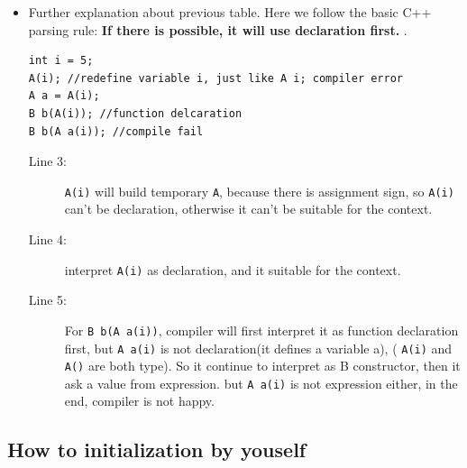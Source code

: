 \documentclass[a4paper,11pt,twoside]{book}
\begin{document}
\begin{itemize}
	\item Further explanation about previous table. Here we follow the basic C++ parsing rule: \textbf{If there is possible, it will use declaration first. }.
\begin{lstlisting}
int i = 5;
A(i); //redefine variable i, just like A i; compiler error
A a = A(i);
B b(A(i)); //function delcaration
B b(A a(i)); //compile fail
\end{lstlisting}	
	\begin{description}
		\item[Line 3:] \texttt{A(i)} will build temporary \texttt{A}, because there is assignment sign, so \texttt{A(i)} can't be declaration, otherwise it can't be suitable for the context.
		
		\item[Line 4:] interpret \texttt{A(i)} as declaration, and it suitable for the context.
		
		\item[Line 5:] For \texttt{B b(A a(i))}, compiler will first interpret it as function declaration first, but \texttt{A a(i)} is not declaration(it defines a variable a), ( \texttt{A(i)} and \texttt{A()} are both type). So it continue to interpret as B constructor, then it ask a value from expression. but \texttt{A a(i)} is not expression either, in the end, compiler is not happy. 
	\end{description}
			
\end{itemize}

\subsection{How to initialization by youself}
\end{document}
